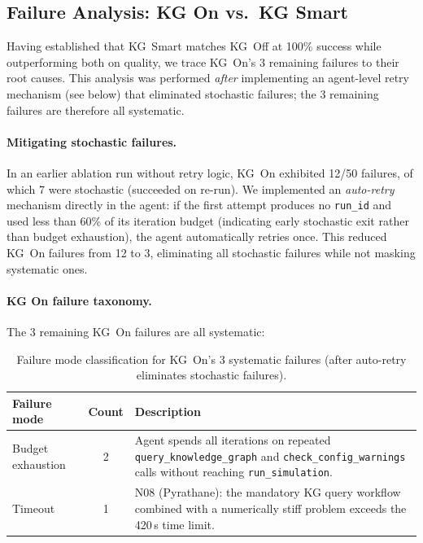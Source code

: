 \documentclass[preprint,review,12pt]{elsarticle}
\begin{document}
\subsection{Failure Analysis: KG On vs.\ KG Smart}
\label{sec:failure-analysis}

Having established that KG~Smart matches KG~Off at 100\% success while
outperforming both on quality, we trace KG~On's 3 remaining failures
to their root causes.  This analysis was performed \emph{after}
implementing an agent-level retry mechanism (see below) that
eliminated stochastic failures; the 3 remaining failures are therefore
all systematic.

\paragraph{Mitigating stochastic failures.}
In an earlier ablation run without retry logic, KG~On exhibited 12/50
failures, of which 7 were stochastic (succeeded on re-run).  We
implemented an \emph{auto-retry} mechanism directly in the agent:
if the first attempt produces no \texttt{run\_id} and used less than
60\% of its iteration budget (indicating early stochastic exit rather
than budget exhaustion), the agent automatically retries once.
This reduced KG~On failures from 12 to 3, eliminating all stochastic
failures while not masking systematic ones.

\paragraph{KG On failure taxonomy.}
The 3 remaining KG~On failures are all systematic:

\begin{table}[htbp]
\centering\footnotesize
\caption{Failure mode classification for KG~On's 3 systematic failures
  (after auto-retry eliminates stochastic failures).}
\label{tab:failure-modes}
\setlength{\tabcolsep}{4pt}
\begin{tabular}{lcp{5.2cm}}
\toprule
Failure mode & Count & Description \\
\midrule
Budget exhaustion  & 2 &
  Agent spends all iterations on repeated
  \texttt{query\_knowledge\_graph} and
  \texttt{check\_config\_warnings} calls without
  reaching \texttt{run\_simulation}. \\
\addlinespace
Timeout & 1 &
  N08 (Pyrathane): the mandatory KG query workflow
  combined with a numerically stiff problem exceeds the
  420\,s time limit. \\
\bottomrule
\end{tabular}
\end{table}
\end{document}
